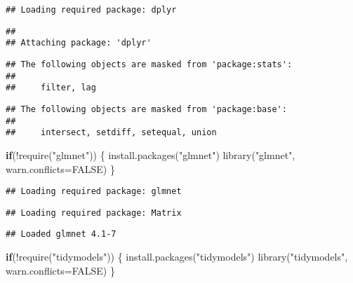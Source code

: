 \documentclass[
]{article}
\newenvironment{Shaded}{\begin{snugshade}}{\end{snugshade}}
\newcommand{\AttributeTok}[1]{\textcolor[rgb]{0.77,0.63,0.00}{#1}}
\newcommand{\ConstantTok}[1]{\textcolor[rgb]{0.00,0.00,0.00}{#1}}
\newcommand{\ControlFlowTok}[1]{\textcolor[rgb]{0.13,0.29,0.53}{\textbf{#1}}}
\newcommand{\FunctionTok}[1]{\textcolor[rgb]{0.00,0.00,0.00}{#1}}
\newcommand{\NormalTok}[1]{#1}
\newcommand{\SpecialCharTok}[1]{\textcolor[rgb]{0.00,0.00,0.00}{#1}}
\newcommand{\StringTok}[1]{\textcolor[rgb]{0.31,0.60,0.02}{#1}}
\begin{document}
\begin{verbatim}
## Loading required package: dplyr
\end{verbatim}

\begin{verbatim}
## 
## Attaching package: 'dplyr'
\end{verbatim}

\begin{verbatim}
## The following objects are masked from 'package:stats':
## 
##     filter, lag
\end{verbatim}

\begin{verbatim}
## The following objects are masked from 'package:base':
## 
##     intersect, setdiff, setequal, union
\end{verbatim}

\begin{Shaded}
\begin{Highlighting}[]
\ControlFlowTok{if}\NormalTok{(}\SpecialCharTok{!}\FunctionTok{require}\NormalTok{(}\StringTok{"glmnet"}\NormalTok{)) \{}
  \FunctionTok{install.packages}\NormalTok{(}\StringTok{"glmnet"}\NormalTok{)}
  \FunctionTok{library}\NormalTok{(}\StringTok{"glmnet"}\NormalTok{, }\AttributeTok{warn.conflicts=}\ConstantTok{FALSE}\NormalTok{)}
\NormalTok{\}}
\end{Highlighting}
\end{Shaded}

\begin{verbatim}
## Loading required package: glmnet
\end{verbatim}

\begin{verbatim}
## Loading required package: Matrix
\end{verbatim}

\begin{verbatim}
## Loaded glmnet 4.1-7
\end{verbatim}

\begin{Shaded}
\begin{Highlighting}[]
\ControlFlowTok{if}\NormalTok{(}\SpecialCharTok{!}\FunctionTok{require}\NormalTok{(}\StringTok{"tidymodels"}\NormalTok{)) \{}
  \FunctionTok{install.packages}\NormalTok{(}\StringTok{"tidymodels"}\NormalTok{)}
  \FunctionTok{library}\NormalTok{(}\StringTok{"tidymodels"}\NormalTok{, }\AttributeTok{warn.conflicts=}\ConstantTok{FALSE}\NormalTok{)}
\NormalTok{\}}
\end{Highlighting}
\end{Shaded}
\end{document}
